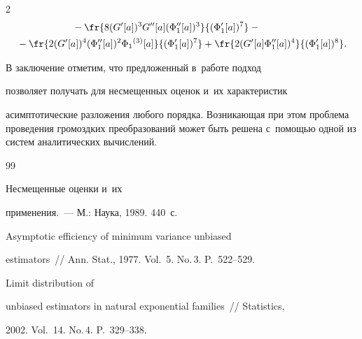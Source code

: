\begin{multicols}{2}
\begin{align*}
& \hspace*{20mm}{}- \fr{8 (G'[a])^3 G''[a] (\Phi_1''[a])^3}{(\Phi_1'[a])^7}


 -{}\\


 &{}-\fr{2 (G'[a])^4 (\Phi_1''[a])^2 \Phi_1{}^{(3)}[a]}{(\Phi_1'[a])^7}


 +\fr{2 (G'[a] \Phi_1''[a])^4}{(\Phi_1'[a])^8}.


 \end{align*}











 В заключение отметим, что предложенный в~работе подход


 позволяет получать для несмещенных оценок и~их характеристик


 асимптотические разложения любого порядка. Возникающая при этом проблема проведения громоздких преобразований может быть решена с~по\-мощью одной из систем аналитических вычислений.











{\small\frenchspacing


 {%




 \begin{thebibliography}{99}




 Несмещенные оценки и~их


  применения.~--- М.: Наука, 1989. 440~с.






 Asymptotic efficiency of minimum variance unbiased


 estimators~// Ann.  Stat., 1977. Vol.~5. No.\,3.  P.~522--529.






 Limit distribution of


 unbiased estimators in natural exponential families~// Statistics,


 2002. Vol.~14. No.\,4.  P.~329--338.



\end{thebibliography}}}
\end{multicols}
